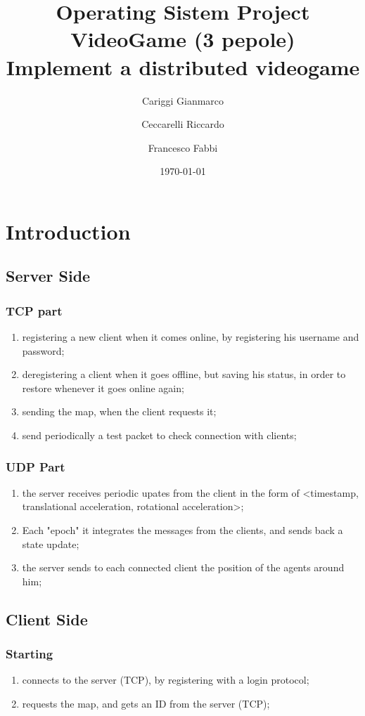 \documentclass{report}
\begin{document}
\title{Operating Sistem Project \\ \large {VideoGame (3 pepole)}
\\ \large{Implement a distributed videogame}}
\author{Cariggi Gianmarco \and Ceccarelli Riccardo \and Francesco Fabbi}
\date{\today}
\maketitle

\tableofcontents
\chapter{Introduction}
\section{Server Side}
\subsection{TCP part}
\begin{enumerate}
\item registering a new client when it comes online, by registering his username and password;
\item deregistering a client when it goes offline, but saving his status, in order to restore whenever it goes online again;
\item sending the map, when the client requests it;
\item send periodically a test packet to check connection with clients;
\end{enumerate}
\subsection{UDP Part}
\begin{enumerate}
\item the server receives periodic upates from the client in the form of <timestamp, translational acceleration, rotational acceleration>;
\item Each "epoch" it integrates the messages from the clients, and sends back a state update;
\item the server sends to each connected client the position of the agents around him;
\end{enumerate}
\section{Client Side}
\subsection{Starting}
\begin{enumerate}
\item connects to the server (TCP), by registering with a login protocol;
\item requests the map, and gets an ID from the server (TCP);
\end{enumerate}
\end{document}
